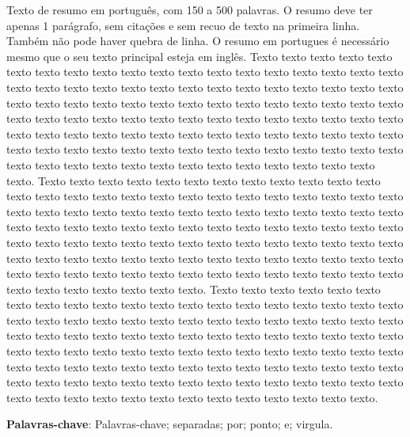 
\begin{resumo}[Resumo] 
Texto de resumo em português, com 150 a 500 palavras. O resumo deve ter apenas 1 parágrafo, sem citações e sem recuo de texto na primeira linha. Também não pode haver quebra de linha. O resumo em portugues é necessário mesmo que o seu texto principal esteja em inglês. Texto texto texto texto texto texto texto texto texto texto texto texto texto texto texto texto texto texto texto texto texto texto texto texto texto texto texto texto texto texto texto texto texto texto texto texto texto texto texto texto texto texto texto texto texto texto texto texto texto texto texto texto texto texto texto texto texto texto texto texto texto texto texto texto texto texto texto texto texto texto texto texto texto texto texto texto texto texto texto texto texto texto texto texto texto texto texto texto texto texto texto texto texto texto texto texto texto texto texto texto texto texto texto. Texto texto texto texto texto texto texto texto texto texto texto texto texto texto texto texto texto texto texto texto texto texto texto texto texto texto texto texto texto texto texto texto texto texto texto texto texto texto texto texto texto texto texto texto texto texto texto texto texto texto texto texto texto texto texto texto texto texto texto texto texto texto texto texto texto texto texto texto texto texto texto texto texto texto texto texto texto texto texto texto texto texto texto texto texto texto texto texto texto texto texto texto texto texto texto texto texto texto texto texto texto texto texto. Texto texto texto texto texto texto texto texto texto texto texto texto texto texto texto texto texto texto texto texto texto texto texto texto texto texto texto texto texto texto texto texto texto texto texto texto texto texto texto texto texto texto texto texto texto texto texto texto texto texto texto texto texto texto texto texto texto texto texto texto texto texto texto texto texto texto texto texto texto texto texto texto texto texto texto texto texto texto texto texto texto texto texto texto texto texto texto texto texto texto texto texto texto texto texto texto texto texto texto texto texto texto texto. 

 \vspace{\onelineskip}
    
 \noindent
 \textbf{Palavras-chave}: Palavras-chave; separadas; por; ponto; e; virgula.
\end{resumo}



